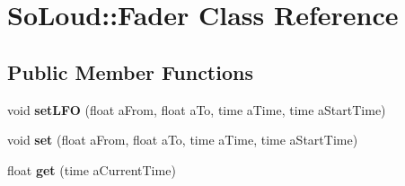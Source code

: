 \hypertarget{class_so_loud_1_1_fader}{}\section{So\+Loud\+::Fader Class Reference}
\label{class_so_loud_1_1_fader}
\subsection*{Public Member Functions}
\begin{DoxyCompactItemize}
\item 
\mbox{\label{class_so_loud_1_1_fader_ab832eabb3306ab0b51a6085f50dfe15c}} 
void {\bfseries set\+L\+FO} (float a\+From, float a\+To, time a\+Time, time a\+Start\+Time)
\item 
\mbox{\label{class_so_loud_1_1_fader_a75bbcceb1df1300da93bb198076a818b}} 
void {\bfseries set} (float a\+From, float a\+To, time a\+Time, time a\+Start\+Time)
\item 
\mbox{\label{class_so_loud_1_1_fader_a7a6639fa22a5d7e10f04a473e65eeba1}} 
float {\bfseries get} (time a\+Current\+Time)
\end{DoxyCompactItemize}
